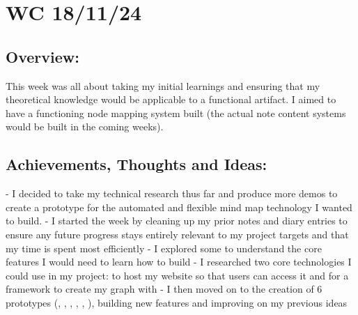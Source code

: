 \section{WC 18/11/24}

\subsection*{Overview:}

This week was all about taking my initial learnings and ensuring that my theoretical knowledge would be applicable to a functional artifact. I aimed to have a functioning node mapping system built (the actual note content systems would be built in the coming weeks).

\subsection*{Achievements, Thoughts and Ideas:}
- I decided to take my technical research thus far and produce more demos to create a prototype for the automated and flexible mind map technology I wanted to build. 
- I started the week by cleaning up my prior notes and diary entries to ensure any future progress stays entirely relevant to my project targets and that my time is spent most efficiently
- I explored some  to understand the core features I would need to learn how to build
- I researched two core technologies I could use in my project:  to host my website so that users can access it and  for a framework to create my graph with
- I then moved on to the creation of 6 prototypes (, , , , , ), building new features and improving on my previous ideas 

